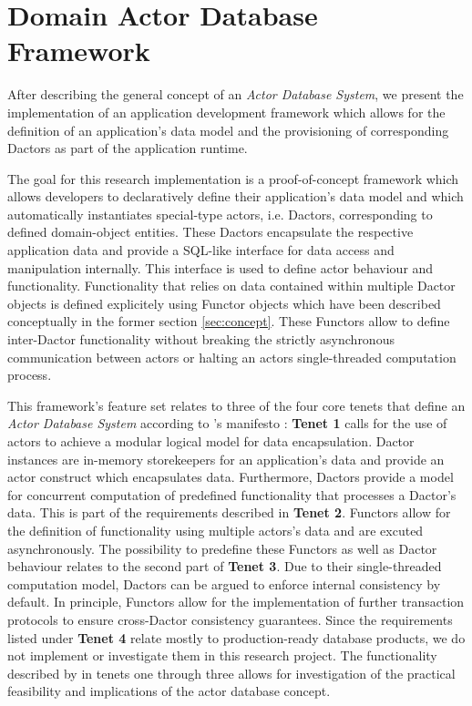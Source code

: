 
\section{Domain Actor Database Framework}\label{sec:framework}

After describing the general concept of an \textit{Actor Database System}, we present the implementation of an application development framework which allows for the definition of an application's data model and the provisioning of corresponding Dactors as part of the application runtime.

The goal for this research implementation is a proof-of-concept framework which allows developers to declaratively define their application's data model
and which automatically instantiates special-type actors, i.e. Dactors, corresponding to defined domain-object entities.
These Dactors encapsulate the respective application data and provide a SQL-like interface for data access and manipulation internally.
This interface is used to define actor behaviour and functionality.
Functionality that relies on data contained within multiple Dactor objects is defined explicitely using Functor objects which have been described conceptually in the former section \ref{sec:concept}.
These Functors allow to define inter-Dactor functionality without breaking the strictly asynchronous communication between actors or halting an actors single-threaded computation process.

This framework's feature set relates to three of the four core tenets that define an \textit{Actor Database System} according to \citeauthor{manifesto}'s manifesto \cite{manifesto}:
\textbf{Tenet 1} calls for the use of actors to achieve a modular logical model for data encapsulation.
Dactor instances are in-memory storekeepers for an application's data and provide an actor construct which encapsulates data.
Furthermore, Dactors provide a model for concurrent computation of predefined functionality that processes a Dactor's data.
This is part of the requirements described in \textbf{Tenet 2}.
Functors allow for the definition of functionality using multiple actors's data and are excuted asynchronously.
The possibility to predefine these Functors as well as Dactor behaviour relates to the second part of \textbf{Tenet 3}.
Due to their single-threaded computation model, Dactors can be argued to enforce internal consistency by default.
In principle, Functors allow for the implementation of further transaction protocols to ensure cross-Dactor consistency guarantees.
Since the requirements listed under \textbf{Tenet 4} relate mostly to production-ready database products, we do not implement or investigate them in this research project.
The functionality described by \citeauthor{manifesto} in tenets one through three allows for investigation of the practical feasibility and implications of the actor database concept.

